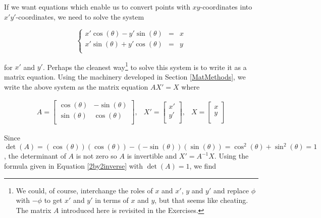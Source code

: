 \smallskip

If we want equations which enable us to convert points with $xy$-coordinates into $x'y'$-coordinates, we need to solve the system

\vspace{-.05in}

\[ \left\{ \begin{array}{rcl} x' \cos(\theta) - y' \sin(\theta) & = & x \\ x'\sin(\theta) + y'\cos(\theta) & = & y \\ \end{array} \right.\]

for $x'$ and $y'$. Perhaps the cleanest way\footnote{We could, of course, interchange the roles of $x$ and $x'$, $y$ and $y'$ and replace $\phi$ with $-\phi$ to get $x'$ and $y'$ in terms of $x$ and $y$, but that seems like cheating.  The matrix $A$ introduced here is revisited in the Exercises.} to solve this system is to write it as a matrix equation. Using the machinery developed in Section \ref{MatMethods}, we write the above system as the matrix equation $AX' = X$ where

\vspace{-.05in}

\[ \begin{array}{ccc}

A = \left[ \begin{array}{rr} \cos(\theta) & -\sin(\theta) \\ \sin(\theta) & \cos(\theta) \\ \end{array} \right], 

&

X'= \left[ \begin{array}{c}x' \\ y'\\ \end{array} \right],

&

X= \left[ \begin{array}{c}x \\ y\\ \end{array} \right]


\end{array} \]

Since $\det(A) = (\cos(\theta))(\cos(\theta)) - (-\sin(\theta))(\sin(\theta)) = \cos^{2}(\theta) + \sin^{2}(\theta) = 1$, the determinant of $A$ is not zero so $A$ is invertible and  $X' = A^{-1}X$.  Using the  formula given in Equation \ref{2by2inverse} with $\det(A) = 1$, we find

